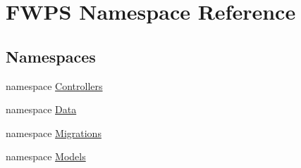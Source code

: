 \hypertarget{namespace_f_w_p_s}{}\section{F\+W\+PS Namespace Reference}
\label{namespace_f_w_p_s}
\subsection*{Namespaces}
\begin{DoxyCompactItemize}
\item 
namespace \mbox{\hyperlink{namespace_f_w_p_s_1_1_controllers}{Controllers}}
\item 
namespace \mbox{\hyperlink{namespace_f_w_p_s_1_1_data}{Data}}
\item 
namespace \mbox{\hyperlink{namespace_f_w_p_s_1_1_migrations}{Migrations}}
\item 
namespace \mbox{\hyperlink{namespace_f_w_p_s_1_1_models}{Models}}
\end{DoxyCompactItemize}
